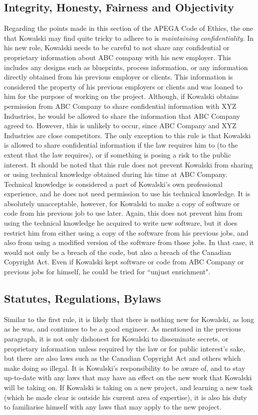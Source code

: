 \documentclass[letterpaper,12pt]{article}
\begin{document}
\subsection{Integrity, Honesty, Fairness and Objectivity}
Regarding the points made in this section of the APEGA Code of Ethics, the one that Kowalski may find quite tricky to
adhere to is \textit{maintaining confidentiality}. In his new role, Kowalski needs to be careful to not share
any confidential or proprietary information about ABC company with his new employer. This includes any designs such as blueprints,
process information, or any information directly obtained from his previous employer or clients. 
This information is considered the property of his previous employers or clients and was loaned to him for the purpose of working on the project.
Although, if Kowalski obtains permission from ABC Company to share confidential information with XYZ Industries, he would be allowed to share the information that ABC Company agreed to. 
However, this is unlikely to occur, since ABC Company and XYZ Industries are close competitors. The only exception to this rule is that Kowalski is allowed to share confidential information if the law requires him to (to the extent that the law requires), or if something is posing a risk to the public interest. It should be noted that this
rule does not prevent Kowalski from sharing or using technical knowledge obtained during his time at ABC Company. Technical knowledge is considered a part of
Kowalski's own professional experience, and he does not need permission to use his technical knowledge. It is absolutely unacceptable, however, for Kowalski to make a copy of
software or code from his previous job to use later. Again, this does not prevent him from using the technical knowledge he acquired to write new software, 
but it does restrict him from either using a copy of the software from his previous jobs, and also from using a modified version of the software
from those jobs. In that case, it would not only be a breach of the code, but also a breach of the Canadian Copyright Act\cite{copyrightact}.
Even if Kowalski kept software or code from ABC Company or previous jobs for himself, he could be tried for ``unjust enrichment".\cite{apegacode}

\subsection{Statutes, Regulations, Bylaws}
Similar to the first rule, it is likely that there is nothing new for Kowalski, as long as he was, and continues to be a good engineer.
As mentioned in the previous paragraph, it is not only dishonest for Kowalski to disseminate secrets, or proprietary information unless required
by the law or for public interest's sake, but there are also laws such as the Canadian Copyright Act and others which make doing so illegal. It is
Kowalski's responsibility to be aware of, and to stay up-to-date with any laws that may have an effect on the new work that Kowalski will be taking on.
If Kowalski is taking on a new project, and learning a new task (which he made clear is outside his current area of expertise), it is also his duty to
familiarise himself with any laws that may apply to the new project.
\end{document}
